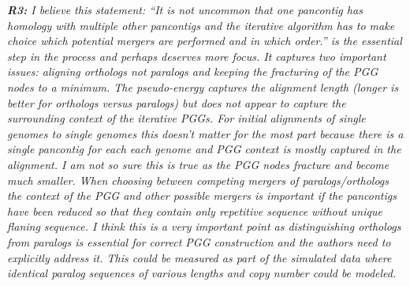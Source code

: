 \documentclass[aps,rmp,onecolumn]{revtex4-1}
\newcommand{\reviewer}[2]{{\it \textbf{#1:} #2\vskip 5mm}}
\begin{document}
\reviewer{R3}{I believe this statement: ``It is not uncommon that one pancontig has homology with multiple other pancontigs and the iterative algorithm has to make choice which potential mergers are performed and in which order.'' is the essential step in the process and perhaps deserves more focus. It captures two important issues: aligning orthologs not paralogs and keeping the fracturing of the PGG nodes to a minimum. The pseudo-energy captures the alignment length (longer is better for orthologs versus paralogs) but does not appear to capture the surrounding context of the iterative PGGs. For initial alignments of single genomes to single genomes this doesn't matter for the most part because there is a single pancontig for each each genome and PGG context is mostly captured in the alignment. I am not so sure this is true as the PGG nodes fracture and become much smaller. When choosing between competing mergers of paralogs/orthologs the context of the PGG and other possible mergers is important if the pancontigs have been reduced so that they contain only repetitive sequence without unique flaning sequence. I think this is a very important point as distinguishing orthologs from paralogs is essential for correct PGG construction and the authors need to explicitly address it. This could be measured as part of the simulated data where identical paralog sequences of various lengths and copy number could be modeled.}
\end{document}
